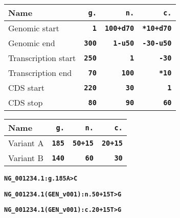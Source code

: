 \documentclass[a4, portrait]{seminar}
\newcommand{\bt}[1]{\texttt{\textbf{#1}}}
\begin{document}
\begin{slide}

  \positionpicture

  \renewcommand{\arraystretch}{1}
  \begin{center}
    \begin{tabular}{l|r|r|r}
      Name                              & \bt{g.}  & \bt{n.}      & \bt{c.} \\
      \hline
      {\scriptsize Genomic start}       & \bt{1}   & \bt{100+d70} & 
        \bt{*10+d70} \\
      {\scriptsize Genomic end}         & \bt{300} & \bt{1-u50}   & 
        \bt{-30-u50} \\
      {\scriptsize Transcription start} & \bt{250} & \bt{1}       & \bt{-30} \\
      {\scriptsize Transcription end}   & \bt{70}  & \bt{100}     & \bt{*10} \\
      {\scriptsize CDS start}           & \bt{220} & \bt{30}      & \bt{1} \\
      {\scriptsize CDS stop}            & \bt{80}  & \bt{90}      & \bt{60} \\
    \end{tabular}
  \end{center}
  \vfill
\end{slide}

\begin{slide}

  \positionpicture

  \renewcommand{\arraystretch}{1}
  \begin{center}
    \begin{tabular}{l|r|r|r}
      Name                    & \bt{g.}  & \bt{n.}    & \bt{c.} \\
      \hline
      {\scriptsize Variant A} & \bt{185} & \bt{50+15} & \bt{20+15} \\
      {\scriptsize Variant B} & \bt{140} & \bt{60}    & \bt{30} \\
    \end{tabular}
  \end{center}

  \bigskip
  \bt{NG\_001234.1:g.185\yellow A\white >\yellow C\white} 

  \bt{NG\_001234.1(GEN\_v001):n.50+15\yellow T\white >\yellow G\white } 

  \bt{NG\_001234.1(GEN\_v001):c.20+15\yellow T\white >\yellow G\white }
  \vfill
\end{slide}
\end{document}
